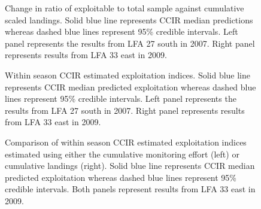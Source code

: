\documentclass[11pt]{article}
\newcommand{\D}{.}
\newcommand{\e}{/backup/bio_data/bio.lobster/figures/} %
\begin{document}
\begin{landscape}
\begin{figure}
\centering
              \caption{Change in ratio of exploitable to total sample against cumulative scaled landings. Solid blue line represents CCIR median predictions whereas dashed blue lines represent 95\% credible intervals. Left panel represents the results from LFA 27 south in 2007. Right panel represents results from LFA 33 east in 2009.}
\end{figure}


\begin{figure}
\centering
             \caption{Within season CCIR estimated exploitation indices. Solid blue line represents CCIR median predicted exploitation whereas dashed blue lines represent 95\% credible intervals. Left panel represents the results from LFA 27 south in 2007. Right panel represents results from LFA 33 east in 2009.}
\end{figure}

\begin{figure}
\centering
             \caption{Comparison of within season CCIR estimated exploitation indices estimated using either the cumulative monitoring effort (left) or cumulative landings (right). Solid blue line represents CCIR median predicted exploitation whereas dashed blue lines represent 95\% credible intervals. Both panels represent results from LFA 33 east in 2009.}
\end{figure}

\end{landscape}
\end{document}
